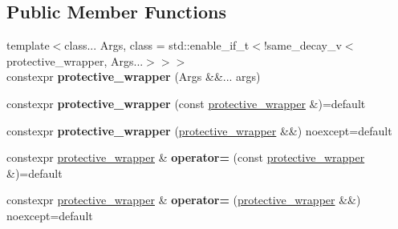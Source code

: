 \subsection*{Public Member Functions}
\begin{DoxyCompactItemize}
\item 
\mbox{\label{classsequoia_1_1utilities_1_1protective__wrapper_aa7651891300f5d42583392aae4868c54}} 
{\footnotesize template$<$class... Args, class  = std\+::enable\+\_\+if\+\_\+t$<$!same\+\_\+decay\+\_\+v$<$protective\+\_\+wrapper, Args...$>$$>$$>$ }\\constexpr {\bfseries protective\+\_\+wrapper} (Args \&\&... args)
\item 
\mbox{\label{classsequoia_1_1utilities_1_1protective__wrapper_a7dc48bc5d3ee87f99726b27e7fcd23a5}} 
constexpr {\bfseries protective\+\_\+wrapper} (const \mbox{\hyperlink{classsequoia_1_1utilities_1_1protective__wrapper}{protective\+\_\+wrapper}} \&)=default
\item 
\mbox{\label{classsequoia_1_1utilities_1_1protective__wrapper_aebc3cd6cc965477ffab94f28c6d4366c}} 
constexpr {\bfseries protective\+\_\+wrapper} (\mbox{\hyperlink{classsequoia_1_1utilities_1_1protective__wrapper}{protective\+\_\+wrapper}} \&\&) noexcept=default
\item 
\mbox{\label{classsequoia_1_1utilities_1_1protective__wrapper_aaf1d871a25b5b8e913f16d0b4adbdedf}} 
constexpr \mbox{\hyperlink{classsequoia_1_1utilities_1_1protective__wrapper}{protective\+\_\+wrapper}} \& {\bfseries operator=} (const \mbox{\hyperlink{classsequoia_1_1utilities_1_1protective__wrapper}{protective\+\_\+wrapper}} \&)=default
\item 
\mbox{\label{classsequoia_1_1utilities_1_1protective__wrapper_a31fe2a2a281d0a38d4470586636f1c7a}} 
constexpr \mbox{\hyperlink{classsequoia_1_1utilities_1_1protective__wrapper}{protective\+\_\+wrapper}} \& {\bfseries operator=} (\mbox{\hyperlink{classsequoia_1_1utilities_1_1protective__wrapper}{protective\+\_\+wrapper}} \&\&) noexcept=default
\item 
\mbox{\label{classsequoia_1_1utilities_1_1protective__wrapper_aae4552413bb78efb8f59c85db2d02689}} 

\end{DoxyCompactItemize}
